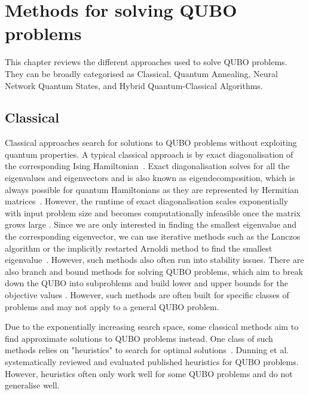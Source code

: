 \chapter{Methods for solving QUBO problems}\label{review}
\vspace{2em}

This chapter reviews the different approaches used to solve QUBO problems. They can be broadly categorised as Classical, Quantum Annealing, Neural Network Quantum States, and Hybrid Quantum-Classical Algorithms.

\section{Classical}
Classical approaches search for solutions to QUBO problems without exploiting quantum properties. A typical classical approach is by exact diagonalisation of the corresponding Ising Hamiltonian~\cite{b25}. Exact diagonalisation solves for all the eigenvalues and eigenvectors and is also known as eigendecomposition, which is always possible for quantum Hamiltonians as they are represented by Hermitian matrices~\cite{b27}. However, the runtime of exact diagonalisation scales exponentially with input problem size and becomes computationally infeasible once the matrix grows large \cite{b25}. Since we are only interested in finding the smallest eigenvalue and the corresponding eigenvector, we can use iterative methods such as the Lanczos algorithm or the implicitly restarted Arnoldi method to find the smallest eigenvalue~\cite{b28,b29}. However, such methods also often run into stability issues. There are also branch and bound methods for solving QUBO problems, which aim to break down the QUBO into subproblems and build lower and upper bounds for the objective values \cite{otaki2023experimental}. However, such methods are often built for specific classes of problems and may not apply to a general QUBO problem.

Due to the exponentially increasing search space, some classical methods aim to find approximate solutions to QUBO problems instead. One class of such methods relies on "heuristics" to search for optimal solutions~\cite{b12}. Dunning et al. systematically reviewed and evaluated published heuristics for QUBO problems. However, heuristics often only work well for some QUBO problems and do not generalise well.


